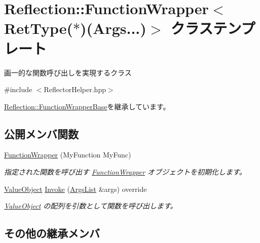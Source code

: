 \hypertarget{class_reflection_1_1_function_wrapper_3_01_ret_type_07_5_08_07_args_8_8_8_08_4}{}\section{Reflection\+:\+:Function\+Wrapper$<$ Ret\+Type($\ast$)(Args...)$>$ クラステンプレート}
\label{class_reflection_1_1_function_wrapper_3_01_ret_type_07_5_08_07_args_8_8_8_08_4}


画一的な関数呼び出しを実現するクラス 




{\ttfamily \#include $<$Reflector\+Helper.\+hpp$>$}



\hyperlink{class_reflection_1_1_function_wrapper_base}{Reflection\+::\+Function\+Wrapper\+Base}を継承しています。

\subsection*{公開メンバ関数}
\begin{DoxyCompactItemize}
\item 
\hyperlink{class_reflection_1_1_function_wrapper_3_01_ret_type_07_5_08_07_args_8_8_8_08_4_a373827001dcb898d9c4e1d3ca561db2e}{Function\+Wrapper} (My\+Function My\+Func)
\begin{DoxyCompactList}\small\item\em 指定された関数を呼び出す \hyperlink{class_reflection_1_1_function_wrapper}{Function\+Wrapper} オブジェクトを初期化します。\end{DoxyCompactList}\item 
\hyperlink{class_reflection_1_1_value_object}{Value\+Object} \hyperlink{class_reflection_1_1_function_wrapper_3_01_ret_type_07_5_08_07_args_8_8_8_08_4_a4e471c87f1e5e5cc14c4861f50698ebd}{Invoke} (\hyperlink{_reflector_helper_8hpp_a83512919cd42ea73553f4d173e7ace4c}{Args\+List} \&args) override
\begin{DoxyCompactList}\small\item\em \hyperlink{class_reflection_1_1_value_object}{Value\+Object} の配列を引数として関数を呼び出します。\end{DoxyCompactList}\end{DoxyCompactItemize}
\subsection*{その他の継承メンバ}


